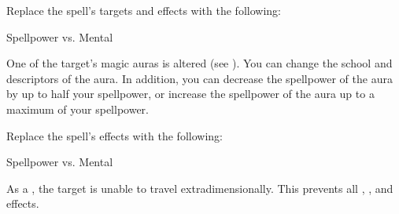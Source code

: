 


Replace the spell's targets and effects with the following:
\begin{spellcontent}

\begin{augmenttargetinginfo}




\end{augmenttargetinginfo}


\begin{augmenteffects}




\begin{spellattack}{Spellpower vs. Mental}


\spellsuccess
One of the target's magic auras is altered (see ).
You can change the school and descriptors of the aura.
In addition, you can decrease the spellpower of the aura by up to half your spellpower, or increase the spellpower of the aura up to a maximum of your spellpower.



\end{spellattack}





\end{augmenteffects}

\end{spellcontent}








Replace the spell's effects with the following:
\begin{spellcontent}

\begin{augmenteffects}




\begin{spellattack}{Spellpower vs. Mental}


\spellsuccess
As a , the target is unable to travel extradimensionally.
This prevents all , , and  effects.



\end{spellattack}





\end{augmenteffects}

\end{spellcontent}





